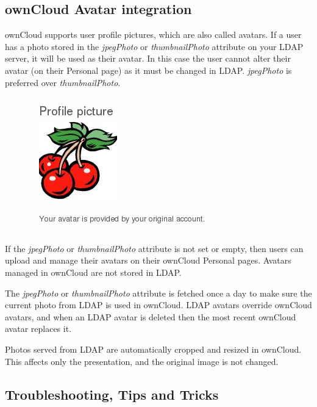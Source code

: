 \documentclass[letterpaper,10pt,english]{sphinxmanual}
\begin{document}
\subsection{ownCloud Avatar integration}
\label{configuration_user/user_auth_ldap:owncloud-avatar-integration}
ownCloud supports user profile pictures, which are also called avatars. If a user
has a photo stored in the \emph{jpegPhoto} or \emph{thumbnailPhoto} attribute on your LDAP
server, it will be used as their avatar. In this case the user cannot alter their
avatar (on their Personal page) as it must be changed in LDAP. \emph{jpegPhoto} is
preferred over \emph{thumbnailPhoto}.
\begin{figure}[htbp]
\centering

\includegraphics{ldap-fetched-avatar.png}
\end{figure}

If the \emph{jpegPhoto} or \emph{thumbnailPhoto} attribute is not set or empty, then
users can upload and manage their avatars on their ownCloud Personal pages.
Avatars managed in ownCloud are not stored in LDAP.

The \emph{jpegPhoto} or \emph{thumbnailPhoto} attribute is fetched once a day to make
sure the current photo from LDAP is used in ownCloud. LDAP avatars override
ownCloud avatars, and when an LDAP avatar is deleted then the most recent
ownCloud avatar replaces it.

Photos served from LDAP are automatically cropped and resized in ownCloud. This
affects only the presentation, and the original image is not changed.


\subsection{Troubleshooting, Tips and Tricks}
\label{configuration_user/user_auth_ldap:troubleshooting-tips-and-tricks}
\end{document}
